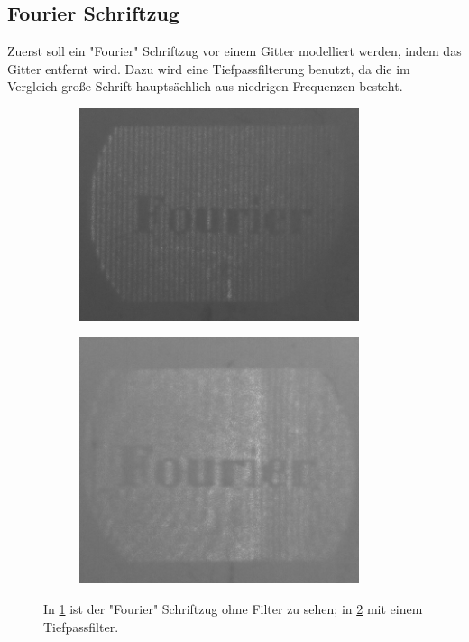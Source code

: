 \subsection{Fourier Schriftzug}
Zuerst soll ein "Fourier" Schriftzug vor einem Gitter modelliert werden, indem das Gitter entfernt wird. Dazu wird eine Tiefpassfilterung benutzt, da die im Vergleich große Schrift hauptsächlich aus niedrigen Frequenzen besteht. 


\begin{figure}[h]
\begin{subfigure}[c]{0.5\textwidth}

\includegraphics[width=0.9\textwidth]{Fourier.png}
	      \caption{}
          \label{fig:NiceImage1}
          
\end{subfigure}
\begin{subfigure}[c]{0.5\textwidth}
	\includegraphics[width=0.9\textwidth]{Fourier_Filter.png}
	      \caption{}
          \label{fig:NiceImage2}
\end{subfigure}
\caption{In \cref{fig:NiceImage1} ist der "Fourier" Schriftzug ohne Filter zu sehen; in \cref{fig:NiceImage2} mit einem Tiefpassfilter.}
\label{Fourier}
\end{figure}   

